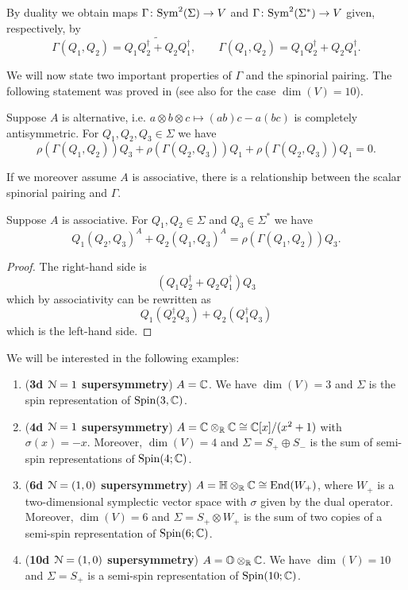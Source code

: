 \documentclass[10pt, oneside]{article}
\begin{document}
By duality we obtain maps $\Gamma\colon{\rm Sym}^2(\Sigma)\rightarrow V$ and $\Gamma\colon {\rm Sym}^2(\Sigma^*)\rightarrow V$ given, respectively, by
\[\Gamma(Q_1, Q_2) = \widetilde{Q_1Q_2^\dagger + Q_2Q_1^\dagger},\qquad \Gamma(Q_1, Q_2) = Q_1Q_2^\dagger + Q_2Q_1^\dagger.\]

We will now state two important properties of $\Gamma$ and the spinorial pairing. The following statement was proved in \cite[Theorem 11]{BaezHuerta} (see also \cite{Schray} for the case $\dim(V)=10$).

\begin{theorem}
Suppose $A$ is alternative, i.e. $a\otimes b\otimes c\mapsto (ab)c - a(bc)$ is completely antisymmetric. For $Q_1, Q_2, Q_3\in\Sigma$ we have
\[\rho(\Gamma(Q_1, Q_2))Q_3 + \rho(\Gamma(Q_2, Q_3))Q_1 + \rho(\Gamma(Q_2, Q_3))Q_1 = 0.\]
\label{thm:3psi}
\end{theorem}

If we moreover assume $A$ is associative, there is a relationship between the scalar spinorial pairing and $\Gamma$.

\begin{theorem}
Suppose $A$ is associative. For $Q_1, Q_2\in\Sigma$ and $Q_3\in\Sigma^*$ we have
\[Q_1(Q_2, Q_3)^A + Q_2(Q_1, Q_3)^A = \rho(\Gamma(Q_1, Q_2)) Q_3.\]
\label{thm:matter3psi}
\end{theorem}
\begin{proof}
The right-hand side is
\[(Q_1Q_2^\dagger + Q_2Q_1^\dagger)Q_3\]
which by associativity can be rewritten as
\[Q_1(Q_2^\dagger Q_3) + Q_2(Q_1^\dagger Q_3)\]
which is the left-hand side.
\end{proof}

We will be interested in the following examples:
\begin{enumerate}
\item (\textbf{3d $\mathcal{N}=1$ supersymmetry}) $A = \mathbb C$. We have $\dim(V) = 3$ and $\Sigma$ is the spin representation of $\mathrm{Spin}(3, \mathbb C)$.

\item (\textbf{4d $\mathcal{N}=1$ supersymmetry}) $A = \mathbb C\otimes_{\mathbb R}\mathbb C\cong \mathbb C[x]/(x^2+1)$ with $\sigma(x) = -x$. Moreover, $\dim(V) = 4$ and $\Sigma=S_+\oplus S_-$ is the sum of semi-spin representations of $\mathrm{Spin}(4;\mathbb C)$.

\item (\textbf{6d $\mathcal{N}=(1, 0)$ supersymmetry}) $A=\mathbb{H}\otimes_{\mathbb R}\mathbb C\cong \operatorname{End}(W_+)$, where $W_+$ is a two-dimensional symplectic vector space with $\sigma$ given by the dual operator. Moreover, $\dim(V) = 6$ and $\Sigma = S_+\otimes W_+$ is the sum of two copies of a semi-spin representation of $\mathrm{Spin}(6;\mathbb C)$.

\item (\textbf{10d $\mathcal{N}=(1, 0)$ supersymmetry}) $A=\mathbb{O}\otimes_{\mathbb R}\mathbb C$. We have $\dim(V) = 10$ and $\Sigma = S_+$ is a semi-spin representation of $\mathrm{Spin}(10;\mathbb C)$.
\end{enumerate}
\end{document}
